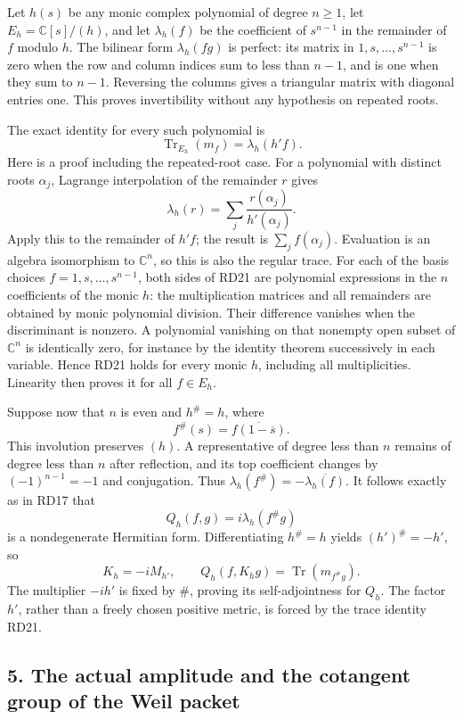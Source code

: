 \documentclass[
  10pt,
  a4paper,
]{article}
\newcounter{none} %
\begin{document}
Let \(h(s)\) be any monic complex polynomial of degree \(n\ge1\), let
\(E_h=\mathbb C[s]/(h)\), and let \(\lambda_h(f)\) be the coefficient of
\(s^{n-1}\) in the remainder of \(f\) modulo \(h\). The bilinear form
\(\lambda_h(fg)\) is perfect: its matrix in \(1,s,\ldots,s^{n-1}\) is
zero when the row and column indices sum to less than \(n-1\), and is
one when they sum to \(n-1\). Reversing the columns gives a triangular
matrix with diagonal entries one. This proves invertibility without any
hypothesis on repeated roots.

The exact identity for every such polynomial is \[
\operatorname{Tr}_{E_h}(m_f)=\lambda_h(h'f).
\tag{RD21}
\] Here is a proof including the repeated-root case. For a polynomial
with distinct roots \(\alpha_j\), Lagrange interpolation of the
remainder \(r\) gives \[
\lambda_h(r)=\sum_j\frac{r(\alpha_j)}{h'(\alpha_j)}.
\] Apply this to the remainder of \(h'f\); the result is
\(\sum_jf(\alpha_j)\). Evaluation is an algebra isomorphism to
\(\mathbb C^n\), so this is also the regular trace. For each of the
basis choices \(f=1,s,\ldots,s^{n-1}\), both sides of RD21 are
polynomial expressions in the \(n\) coefficients of the monic \(h\): the
multiplication matrices and all remainders are obtained by monic
polynomial division. Their difference vanishes when the discriminant is
nonzero. A polynomial vanishing on that nonempty open subset of
\(\mathbb C^n\) is identically zero, for instance by the identity
theorem successively in each variable. Hence RD21 holds for every monic
\(h\), including all multiplicities. Linearity then proves it for all
\(f\in E_h\).

Suppose now that \(n\) is even and \(h^\#=h\), where \[
f^\#(s)=\overline{f(1-\overline s)}.
\tag{RD22}
\] This involution preserves \((h)\). A representative of degree less
than \(n\) remains of degree less than \(n\) after reflection, and its
top coefficient changes by \((-1)^{n-1}=-1\) and conjugation. Thus
\(\lambda_h(f^\#)=-\overline{\lambda_h(f)}\). It follows exactly as in
RD17 that \[
Q_h(f,g)=i\lambda_h(f^\#g)
\tag{RD23}
\] is a nondegenerate Hermitian form. Differentiating \(h^\#=h\) yields
\((h')^\#=-h'\), so \[
K_h=-iM_{h'},\qquad
Q_h(f,K_hg)=\operatorname{Tr}(m_{f^\#g}).
\tag{RD24}
\] The multiplier \(-ih'\) is fixed by \(\#\), proving its
self-adjointness for \(Q_h\). The factor \(h'\), rather than a freely
chosen positive metric, is forced by the trace identity RD21.

\subsection{5. The actual amplitude and the cotangent group of the Weil
packet}\label{the-actual-amplitude-and-the-cotangent-group-of-the-weil-packet}
\end{document}
